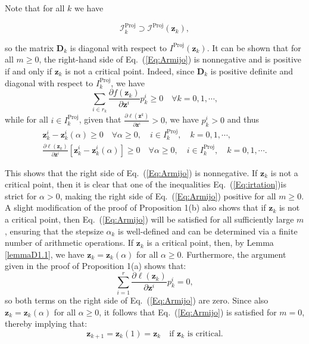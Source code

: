 \documentclass{article}
\theoremstyle{plain}
\theoremstyle{definition}
\def \sI {\mathcal{I}}
\def \D {\mathbf{D}}
\def \z {\mathbf{z}}
\begin{document}
Note that for all \( k \) we have

\[
\sI_k^{\operatorname{Proj}} \supset \sI^{\operatorname{Proj}}\left(\z_k\right), 
\]

so the matrix \( \D_k \) is diagonal with respect to \( I^{\operatorname{Proj}}\left(\z_k\right) \). It can be shown that for all \( m \geq 0 \), the right-hand side of Eq.~(\ref{Eq:Armijo}) is nonnegative and is positive if and only if \(\z_k\) is not a critical point. Indeed, since \( \D_k \) is positive definite and diagonal with respect to \( I_k^{\operatorname{Proj}} \), we have
\begin{equation}
  \label{Eq:irtation}
    \sum_{i \in r_k} \frac{\partial f\left(\z_k\right)}{\partial \z^i} p_k^i \geq 0 \quad \forall k=0,1, \cdots,
\end{equation}
while for all \( i \in I_k^{\operatorname{Proj}} \), given that \(\frac{\partial \ell\left(\z^k\right)}{\partial \z^i} > 0\), we have \( p_k^i > 0 \) and thus
\begin{equation}
\label{Eq:gather}
    \begin{gathered}
\z_k^i - \z_k^i(\alpha) \geq 0 \quad \forall \alpha \geq 0, \quad i \in I_k^{\operatorname{Proj}}, \quad k=0,1, \cdots, \\
\frac{\partial \ell\left(\z_k\right)}{\partial \z^i}\left[\z_k^i - \z_k^i(\alpha)\right] \geq 0 \quad \forall \alpha \geq 0, \quad i \in I_k^{\operatorname{Proj}}, \quad k=0,1, \cdots.
\end{gathered}
\end{equation}


This shows that the right side of Eq.~(\ref{Eq:Armijo}) is nonnegative. If \(\z_k\) is not a critical point, then it is clear  that one of the inequalities Eq.~(\ref{Eq:irtation})is strict for \(\alpha > 0\), making the right side of Eq.~(\ref{Eq:Armijo}) positive for all \( m \geq 0 \). A slight modification of the proof of Proposition 1(b) also shows that if \(\z_k\) is not a critical point, then Eq.~(\ref{Eq:Armijo}) will be satisfied for all sufficiently large \( m \), ensuring that the stepsize \(\alpha_k\) is well-defined and can be determined via a finite number of arithmetic operations. If \(\z_k\) is a critical point, then, by Lemma \ref{lemmaD1.1}, we have \(\z_k = \z_k(\alpha)\) for all \(\alpha \geq 0\). Furthermore, the argument given in the proof of Proposition 1(a) shows that: 
\[
\sum_{i=1}^r \frac{\partial \ell\left(\z_k\right)}{\partial \z^i} p_k^i = 0, 
\]
so both terms on the right side of Eq.~(\ref{Eq:Armijo}) are zero. Since also \(\z_k = \z_k(\alpha)\) for all \(\alpha \geq 0\), it follows that Eq.~(\ref{Eq:Armijo}) is satisfied for \( m = 0 \), thereby implying that: 
\[
\z_{k+1} = \z_k(1) = \z_k \quad \text{if } \z_k \text{ is critical.}
\]
\end{document}
